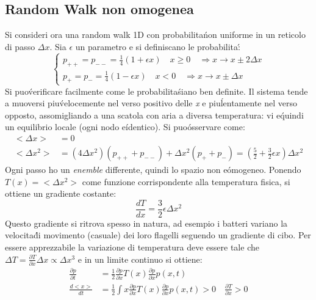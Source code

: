 \documentclass[12pt, a4paper]{book}
\theoremstyle{theorem}
\begin{document}
			\subsection{Random Walk non omogenea}
			Si consideri ora una random walk 1D con probabilita\' non uniforme in un reticolo di passo $\Delta x$.
			Sia $\epsilon$ un parametro e si definiscano le probabilita\':
			\begin{equation*}
				\begin{cases}
					p_{++}=p_{--}=\frac{1}{4}(1+\epsilon x)\quad x\geq 0\quad\Rightarrow x\rightarrow x\pm 2\Delta x\\
					p_+=p_-=\frac{1}{4}(1-\epsilon x)\quad x<0\quad\Rightarrow x\rightarrow x\pm \Delta x
				\end{cases}
			\end{equation*}
			Si puo\' verificare facilmente come le probabilita\' siano ben definite.
			Il sistema tende a muoversi piu\' velocemente nel verso positivo delle \textit{x} e piu\' lentamente nel verso opposto, assomigliando a una scatola con aria a diversa temperatura: vi e\' quindi un equilibrio locale (ogni nodo e\' identico).
			Si puo\' osservare come:
			\begin{equation*}
				\begin{split}
					<\Delta x>&=0\\
					<\Delta x^2>&=(4\Delta x^2)(p_{++}+p_{--})+\Delta x^2(p_++p_-)=\left(\frac{5}{2}+\frac{3}{2}\epsilon x\right)\Delta x^2
				\end{split}
			\end{equation*}
			Ogni passo ho un \textit{enemble} differente, quindi lo spazio non e\' omogeneo.
			Ponendo $T(x)=<\Delta x^2>$ come funzione corrispondente alla temperatura fisica, si ottiene un gradiente costante:
			\begin{equation*}
				\frac{dT}{dx}=\frac{3}{2}\epsilon\Delta x^2
			\end{equation*}
			Questo gradiente si ritrova spesso in natura, ad esempio i batteri variano la velocita\' di movimento (casuale) dei loro flagelli seguendo un gradiente di cibo.
			Per essere apprezzabile la variazione di temperatura deve essere tale che $\Delta T=\frac{\partial T}{\partial x}\Delta x\propto\Delta x^3$ e in un limite continuo si ottiene:
			\begin{equation*}
				\begin{split}
					\frac{\partial p}{\partial t}&=\frac{1}{2}\frac{\partial p}{\partial x}T(x)\frac{\partial p}{\partial x}p(x,t)\\
					\frac{d<x>}{dt}&=\frac{1}{2}\int x\frac{\partial p}{\partial x}T(x)\frac{\partial p}{\partial x}p(x,t)>0\quad \frac{\partial T}{\partial x}>0
				\end{split}
			\end{equation*}
\end{document}
